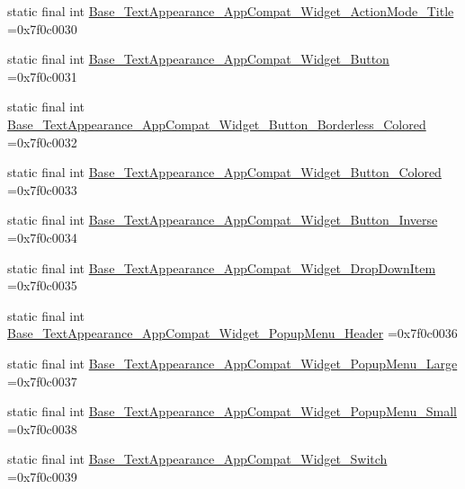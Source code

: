 \begin{DoxyCompactItemize}
static final int \mbox{\hyperlink{classbr_1_1unb_1_1cic_1_1mp_1_1marketmaster_1_1test_1_1R_1_1style_a9de5879d893d85e8effcaee87332fe15}{Base\+\_\+\+Text\+Appearance\+\_\+\+App\+Compat\+\_\+\+Widget\+\_\+\+Action\+Mode\+\_\+\+Title}} =0x7f0c0030
\item 
static final int \mbox{\hyperlink{classbr_1_1unb_1_1cic_1_1mp_1_1marketmaster_1_1test_1_1R_1_1style_a4c6e84ac8737d14267c872e61a2349d1}{Base\+\_\+\+Text\+Appearance\+\_\+\+App\+Compat\+\_\+\+Widget\+\_\+\+Button}} =0x7f0c0031
\item 
static final int \mbox{\hyperlink{classbr_1_1unb_1_1cic_1_1mp_1_1marketmaster_1_1test_1_1R_1_1style_a174d7e0dca0b7e04f93e6927f796de85}{Base\+\_\+\+Text\+Appearance\+\_\+\+App\+Compat\+\_\+\+Widget\+\_\+\+Button\+\_\+\+Borderless\+\_\+\+Colored}} =0x7f0c0032
\item 
static final int \mbox{\hyperlink{classbr_1_1unb_1_1cic_1_1mp_1_1marketmaster_1_1test_1_1R_1_1style_a43679029a22445149b578ad9376d3aa3}{Base\+\_\+\+Text\+Appearance\+\_\+\+App\+Compat\+\_\+\+Widget\+\_\+\+Button\+\_\+\+Colored}} =0x7f0c0033
\item 
static final int \mbox{\hyperlink{classbr_1_1unb_1_1cic_1_1mp_1_1marketmaster_1_1test_1_1R_1_1style_abebb8a7355aea82f4febb851e84e8015}{Base\+\_\+\+Text\+Appearance\+\_\+\+App\+Compat\+\_\+\+Widget\+\_\+\+Button\+\_\+\+Inverse}} =0x7f0c0034
\item 
static final int \mbox{\hyperlink{classbr_1_1unb_1_1cic_1_1mp_1_1marketmaster_1_1test_1_1R_1_1style_a17f90beab654ef922c3e841b26bb1941}{Base\+\_\+\+Text\+Appearance\+\_\+\+App\+Compat\+\_\+\+Widget\+\_\+\+Drop\+Down\+Item}} =0x7f0c0035
\item 
static final int \mbox{\hyperlink{classbr_1_1unb_1_1cic_1_1mp_1_1marketmaster_1_1test_1_1R_1_1style_a6be1183370c9808ccee5445d0ee00902}{Base\+\_\+\+Text\+Appearance\+\_\+\+App\+Compat\+\_\+\+Widget\+\_\+\+Popup\+Menu\+\_\+\+Header}} =0x7f0c0036
\item 
static final int \mbox{\hyperlink{classbr_1_1unb_1_1cic_1_1mp_1_1marketmaster_1_1test_1_1R_1_1style_aae67708b67a9b7df73663719fab66a6d}{Base\+\_\+\+Text\+Appearance\+\_\+\+App\+Compat\+\_\+\+Widget\+\_\+\+Popup\+Menu\+\_\+\+Large}} =0x7f0c0037
\item 
static final int \mbox{\hyperlink{classbr_1_1unb_1_1cic_1_1mp_1_1marketmaster_1_1test_1_1R_1_1style_a9161d6febfc7249358bfc23468033326}{Base\+\_\+\+Text\+Appearance\+\_\+\+App\+Compat\+\_\+\+Widget\+\_\+\+Popup\+Menu\+\_\+\+Small}} =0x7f0c0038
\item 
static final int \mbox{\hyperlink{classbr_1_1unb_1_1cic_1_1mp_1_1marketmaster_1_1test_1_1R_1_1style_ac726729bce027eab50e073f623b43f8f}{Base\+\_\+\+Text\+Appearance\+\_\+\+App\+Compat\+\_\+\+Widget\+\_\+\+Switch}} =0x7f0c0039

\end{DoxyCompactItemize}
